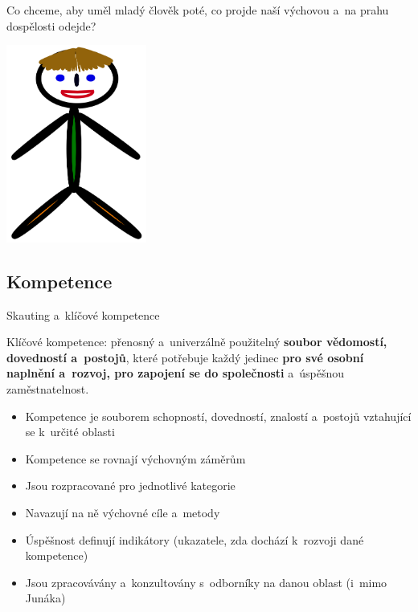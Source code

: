 \documentclass[compress, ucs, xelatex, xcolor=dvipsnames, print,
  hyperref={
    bookmarks=true,
    unicode=true,
    colorlinks=true,
    plainpages=false,
    pdfkeywords={Skaut, Junak, Skauting, Vychovna metoda},
    linkcolor=Black,
    anchorcolor=Black,
    citecolor=OliveGreen,
    filecolor=OliveGreen,
    menucolor=Black,
    urlcolor=OliveGreen,
    pdftex}
  ]{beamer}
\begin{document}
\begin{frame}{Co chceme, aby uměl mladý člověk poté, co projde naší výchovou a~na prahu dospělosti odejde?}
  \begin{center}
    \includegraphics[height=6.5cm]{pepicek.png}
  \end{center}
\end{frame}

\subsection{Kompetence}

\begin{frame}{Skauting a~klíčové kompetence}
  \begin{center}
    Klíčové kompetence: přenosný a~univerzálně použitelný \textbf{soubor vědomostí, dovedností a~postojů}, které potřebuje každý jedinec \textbf{pro své osobní naplnění a~rozvoj, pro zapojení se do společnosti} a~úspěšnou zaměstnatelnost.
  \end{center}
  \begin{itemize}
    \item Kompetence je souborem schopností, dovedností, znalostí a~postojů vztahující se k~určité oblasti
    \item Kompetence se rovnají výchovným záměrům
    \item Jsou rozpracované pro jednotlivé kategorie
    \item Navazují na ně výchovné cíle a~metody
    \item Úspěšnost definují indikátory (ukazatele, zda dochází k~rozvoji dané kompetence)
    \item Jsou zpracovávány a~konzultovány s~odborníky na danou oblast (i~mimo Junáka)
  \end{itemize}
\end{frame}
\end{document}
